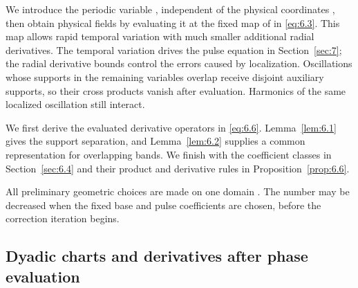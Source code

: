 We introduce the periodic variable , independent of the physical coordinates , then obtain physical fields by evaluating it at the fixed map of  in \eqref{eq:6.3}. This map allows rapid temporal variation with much smaller additional radial derivatives. The temporal variation drives the pulse equation in Section~\ref{sec:7}; the radial derivative bounds control the errors caused by localization. Oscillations whose supports in the remaining variables overlap receive disjoint auxiliary supports, so their cross products vanish after evaluation. Harmonics of the same localized oscillation still interact.

We first derive the evaluated derivative operators in \eqref{eq:6.6}. Lemma~\ref{lem:6.1} gives the support separation, and Lemma~\ref{lem:6.2} supplies a common representation for overlapping bands. We finish with the coefficient classes in Section~\ref{sec:6.4} and their product and derivative rules in Proposition~\ref{prop:6.6}.

All preliminary geometric choices are made on one domain . The number  may be decreased when the fixed base and pulse coefficients are chosen, before the correction iteration begins.

\subsection{Dyadic charts and derivatives after phase evaluation}\label{sec:6.1}

